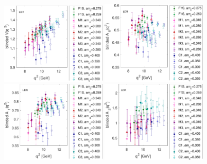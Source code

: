 \documentclass[a4paper,10pt]{article}
\begin{document}
\begin{figure}[p]
 \includegraphics[width=0.45\textwidth]{figures/BsDsStarV_LDR_Ratio_combined.pdf} 
\includegraphics[width=0.45\textwidth]{figures/BsDsStarA0_LDR_Ratio_combined.pdf}\\ 
\includegraphics[width=0.45\textwidth]{figures/BsDsStarA1_LDR_Ratio_combined.pdf} 
\includegraphics[width=0.45\textwidth]{figures/BsDsStarA2_LDR_Ratio_combined.pdf} 
\end{figure}
\clearpage
\end{document}
